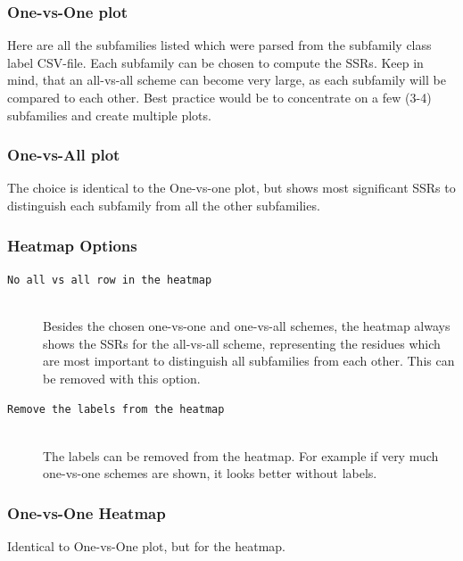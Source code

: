 \documentclass[a4paper,10pt]{article}
\begin{document}
\subsubsection{One-vs-One plot}

Here are all the subfamilies listed which were parsed from the subfamily class label CSV-file. 
Each subfamily can be chosen to compute the SSRs. Keep in mind, that an all-vs-all scheme can become very large, as each
subfamily will be compared to each other. Best practice would be to concentrate on a few (3-4) subfamilies and create multiple plots.

\subsubsection{One-vs-All plot}

The choice is identical to the One-vs-one plot, but shows most significant SSRs to distinguish each subfamily from all the other 
subfamilies.

\subsubsection{Heatmap Options}

\begin{description}

\item[\texttt{No all vs all row in the heatmap}] \hfill \\

Besides the chosen one-vs-one and one-vs-all schemes, the heatmap always shows the SSRs for the all-vs-all scheme, representing the residues
which are most important to distinguish all subfamilies from each other. This can be removed with this option.

\item[\texttt{Remove the labels from the heatmap}] \hfill \\

The labels can be removed from the heatmap. For example if very much one-vs-one schemes are shown, it looks better without labels.

\end{description}

\subsubsection{One-vs-One Heatmap}

Identical to One-vs-One plot, but for the heatmap.
\end{document}
